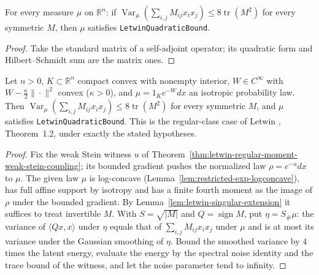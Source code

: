\begin{lemma}
  \label{lem:letwin-operator-matrix-identification}
  \leanok
  For every measure $\mu$ on $\mathbb R^n$: if $\operatorname{Var}_\mu(\sum_{i,j}M_{ij}x_ix_j)\le8\operatorname{tr}(M^2)$ for every
  symmetric $M$, then $\mu$ satisfies \texttt{LetwinQuadraticBound}.
\end{lemma}
\begin{proof}
  \leanok
  Take the standard matrix of a self-adjoint operator; its quadratic form and Hilbert--Schmidt sum are the matrix ones.
\end{proof}

\begin{theorem}
  \label{thm:letwin-regular-class-constant-eight}
  \leanok
  Let $n>0$, $K\subset\mathbb R^n$ compact convex with nonempty interior, $W\in C^\infty$ with $W-\tfrac\kappa2\|\cdot\|^2$
  convex ($\kappa>0$), and $\mu=1_Ke^{-W}dx$ an isotropic probability law. Then
  $\operatorname{Var}_\mu(\sum_{i,j}M_{ij}x_ix_j)\le8\operatorname{tr}(M^2)$ for every symmetric $M$, and $\mu$ satisfies
  \texttt{LetwinQuadraticBound}. This is the regular-class case of Letwin \cite{Letwin2026QuadraticKLS}, Theorem~1.2,
  under exactly the stated hypotheses.
\end{theorem}
\begin{proof}
  \leanok
  Fix the weak Stein witness $u$ of Theorem~\ref{thm:letwin-regular-moment-weak-stein-coupling}; its bounded
  gradient pushes the normalized law $\rho=e^{-u}dx$ to $\mu$. The given law $\mu$ is log-concave
  (Lemma~\ref{lem:restricted-exp-logconcave}), has full affine support by isotropy and has a finite fourth moment as the
  image of $\rho$ under the bounded gradient. By Lemma~\ref{lem:letwin-singular-extension} it suffices to treat invertible
  $M$. With $S=\sqrt{|M|}$ and $Q=\operatorname{sign}M$, put $\eta=S_\#\mu$: the variance of $\langle Qx,x\rangle$ under
  $\eta$ equals that of $\sum_{i,j}M_{ij}x_ix_j$ under $\mu$ and is at most its variance under the Gaussian smoothing of
  $\eta$. Bound the smoothed variance by $4$ times the latent energy, evaluate the energy by the spectral noise identity
  and the trace bound of the witness, and let the noise parameter tend to infinity.
\end{proof}


